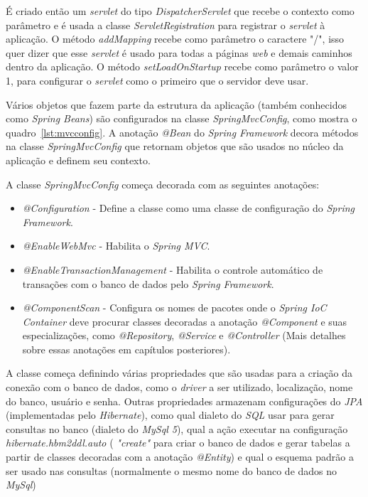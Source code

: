 \documentclass[a4paper,12pt]{article}
\newcommand{\est}[1] {
\textit{#1}}
\newcommand{\classe}[1] {
\textit{#1}}
\newcommand{\sigla}[1] {
\textit{#1}}
\newcommand{\annotation}[1] {
\textit{#1}}
\newcommand{\metodo}[1] {
\textit{#1}}
\newcommand{\javacode}[3] {
	
}
\begin{document}
É criado então um \est{servlet} do tipo \classe{DispatcherServlet} que recebe o contexto como parâmetro e é usada a classe \classe{ServletRegistration} para registrar o \est{servlet} à aplicação. O método \metodo{addMapping} recebe como parâmetro o caractere "/", isso quer dizer que esse \est{servlet} é usado para todas a páginas \est{web} e demais caminhos dentro da aplicação. O método \metodo{setLoadOnStartup} recebe como parâmetro o valor 1, para configurar o \est{servlet} como o primeiro que o servidor deve usar.

\javacode{code/AppInitializer.txt}{Classe \classe{AppInitializer}}{lst:4}

Vários objetos que fazem parte da estrutura da aplicação (também conhecidos como \est{Spring Beans}) são configurados na classe \classe{SpringMvcConfig}, como mostra o quadro~\ref{lst:mvcconfig}. A anotação \annotation{@Bean} do \est{Spring Framework} decora métodos na classe \classe{SpringMvcConfig} que retornam objetos que são usados no núcleo da aplicação e definem seu contexto.

A classe \classe{SpringMvcConfig} começa decorada com as seguintes anotações:

\begin{itemize}
  \item \annotation{@Configuration} - Define a classe como uma classe de configuração do \est{Spring Framework}.
  \item \annotation{@EnableWebMvc} - Habilita o \est{Spring MVC}.
  \item \annotation{@EnableTransactionManagement} - Habilita o controle automático de transações com o banco de dados pelo \est{Spring Framework}.
  \item \annotation{@ComponentScan} - Configura os nomes de pacotes onde o \est{Spring IoC Container} deve procurar classes decoradas a anotação \annotation{@Component} e suas especializações, como \annotation{@Repository}, \annotation{@Service} e \annotation{@Controller} (Mais detalhes sobre essas anotações em capítulos posteriores).  
\end{itemize}

\javacode{code/mvcconfig.txt}{Classe \classe{SpringMvcConfig}}{lst:mvcconfig}

A classe começa definindo várias propriedades que são usadas para a criação da conexão com o banco de dados, como o \est{driver} a ser utilizado, localização, nome do banco, usuário e senha. Outras propriedades armazenam configurações do \sigla{JPA} (implementadas pelo \est{Hibernate}), como qual dialeto do \sigla{SQL} usar para gerar consultas no banco (dialeto do \est{MySql 5}), qual a ação executar na configuração \est{hibernate.hbm2ddl.auto} (\est{"create"} para criar o banco de dados e gerar tabelas a partir de classes decoradas com a anotação \annotation{@Entity}) e qual o esquema padrão a ser usado nas consultas (normalmente o mesmo nome do banco de dados no \est{MySql})
\end{document}
